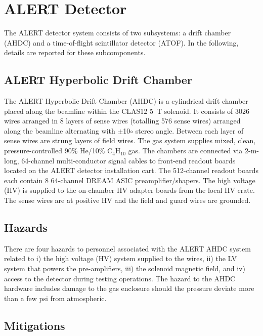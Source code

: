 \section{ALERT Detector}

The ALERT detector system consists of two subsystems: a drift chamber (AHDC) and a time-of-flight
scintillator detector (ATOF). In the following, details are reported for these subcomponents.

\subsection{ALERT Hyperbolic Drift Chamber}

The ALERT Hyperbolic Drift Chamber (AHDC) is a cylindrical drift chamber placed along the beamline
within the CLAS12 5~T solenoid. It consists of 3026 wires arranged in 8 layers of sense wires (totalling
576 sense wires) arranged along the beamline alternating with $\pm$10$\circ$ stereo angle. Between
each layer of sense wires are strung layers of field wires. The gas system supplies mixed, clean,
pressure-controlled 90\% He/10\% C$_4$H$_{10}$ gas. The chambers are connected via 2-m-long, 64-channel
multi-conductor signal cables to front-end readout boards located on the ALERT detector installation
cart. The 512-channel readout boards each contain 8 64-channel DREAM ASIC preamplifier/shapers. The
high voltage (HV) is supplied to the on-chamber HV adapter boards from the local HV crate. The sense
wires are at positive HV and the field and guard wires are grounded.

\subsection{Hazards} 

There are four hazards to personnel associated with the ALERT AHDC system related to i) the high
voltage (HV) system supplied to the wires, ii) the LV system that powers the pre-amplifiers,
iii) the solenoid magnetic field, and iv) access to the detector during testing operations. The
hazard to the AHDC hardware includes damage to the gas enclosure should the pressure deviate more
than a few psi from atmospheric. 

\subsection{Mitigations}

